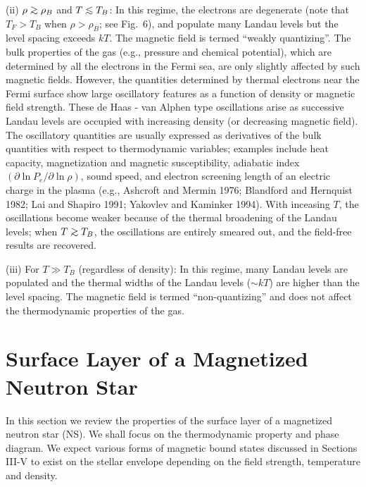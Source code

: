 (ii) $\rho\go\rho_B$ and $T\lo T_B$: In this regime,
the electrons are degenerate (note that $T_F>T_B$ when $\rho>\rho_B$; see
Fig.~6), and populate many Landau levels but the level spacing exceeds
$kT$. The magnetic field is termed ``weakly quantizing''. 
The bulk properties of the gas (e.g., pressure and chemical potential),
which are determined by all the electrons in the Fermi sea, are only slightly
affected by such magnetic fields. However, 
the quantities determined by thermal electrons 
near the Fermi surface show large oscillatory features as a function of
density or magnetic field strength. These de Haas - van Alphen type
oscillations arise as successive Landau levels are occupied with 
increasing density (or decreasing magnetic field).
The oscillatory quantities are usually expressed as derivatives of the 
bulk quantities with respect to thermodynamic variables; 
examples include heat capacity, magnetization and magnetic susceptibility,
adiabatic index $(\partial\ln P_e/\partial\ln\rho)$, sound speed, 
and electron screening length of an electric charge in the plasma 
(e.g., Ashcroft and Mermin 1976; Blandford and Hernquist 1982; 
Lai and Shapiro 1991; Yakovlev and Kaminker 1994).
With inceasing $T$, the oscillations become weaker because of
the thermal broadening of the Landau levels; when $T\go T_B$, the oscillations
are entirely smeared out, and the field-free results are recovered.
 
(iii) For $T\gg T_B$ (regardless of density): In this regime, many Landau
levels are populated and the thermal widths of the Landau levels ($\sim kT$)
are higher than the level spacing. The magnetic field is termed 
``non-quantizing'' and does not affect the thermodynamic properties of 
the gas.



\section{Surface Layer of a Magnetized Neutron Star}

In this section we review the properties of the 
surface layer of a magnetized neutron star (NS).
We shall focus on the thermodynamic property and phase diagram.  
We expect various forms of magnetic bound states discussed in Sections III-V
to exist on the stellar envelope depending on the field strength, 
temperature and density.

